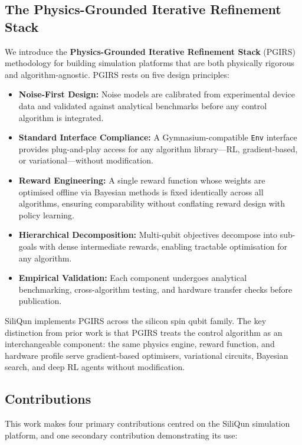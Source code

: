\subsection{The Physics-Grounded Iterative Refinement Stack}
\label{subsec:intro_pgirs}

We introduce the \textbf{Physics-Grounded Iterative Refinement Stack} (PGIRS)
methodology for building simulation platforms that are both physically rigorous
and algorithm-agnostic. PGIRS rests on five design principles:

\begin{itemize}
  \item \textbf{Noise-First Design:} Noise models are calibrated from
    experimental device data and validated against analytical benchmarks before
    any control algorithm is integrated.
  \item \textbf{Standard Interface Compliance:} A Gymnasium-compatible
    \texttt{Env} interface provides plug-and-play access for any algorithm
    library—RL, gradient-based, or variational—without modification.
  \item \textbf{Reward Engineering:} A single reward function whose weights are
    optimised offline via Bayesian methods is fixed identically across all
    algorithms, ensuring comparability without conflating reward design with
    policy learning.
  \item \textbf{Hierarchical Decomposition:} Multi-qubit objectives decompose
    into sub-goals with dense intermediate rewards, enabling tractable
    optimisation for any algorithm.
  \item \textbf{Empirical Validation:} Each component undergoes analytical
    benchmarking, cross-algorithm testing, and hardware transfer checks before
    publication.
\end{itemize}

SiliQun implements PGIRS across the silicon spin qubit family. The key
distinction from prior work is that PGIRS treats the control algorithm as an
interchangeable component: the same physics engine, reward function, and
hardware profile serve gradient-based optimisers, variational circuits,
Bayesian search, and deep RL agents without modification.

\subsection{Contributions}
\label{subsec:contributions}

This work makes four primary contributions centred on the SiliQun simulation
platform, and one secondary contribution demonstrating its use:

